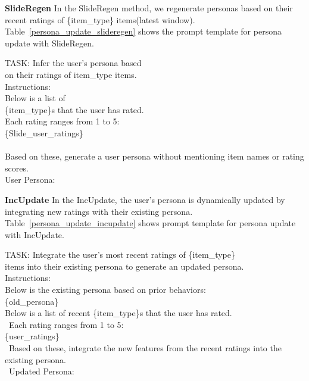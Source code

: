 \textbf{SlideRegen} 
In the SlideRegen method, we regenerate personas based on their recent ratings of 
\{item\_type\} items(latest window). 
Table~\ref{persona_update_slideregen} shows the prompt template for persona update with SlideRegen.

\begin{tcolorbox}
    {\selectfont\small
    TASK: Infer the user's persona based \\
    on their ratings of {item\_type} items.\\
    Instructions: \\
    Below is a list of \\
    \{item\_type\}s that the user has rated. \\
    Each rating ranges from 1 to 5:\\
    \{Slide\_user\_ratings\}\\\\
Based on these, generate a user persona without mentioning item names or rating scores. 
\\
    User Persona:
   }
\end{tcolorbox}
\noindent\begin{minipage}{0.48\textwidth}
\label{persona_update_slideregen}
\end{minipage}
    
    
\textbf{IncUpdate}
In the IncUpdate, the user's persona is dynamically updated by integrating new ratings with their existing persona. Table~\ref{persona_update_incupdate} shows prompt template for persona update with IncUpdate.

\begin{tcolorbox} {\selectfont\small 
    TASK: 
    Integrate the user's most recent ratings of \{item\_type\} \\
    items into their existing persona to generate an updated persona. \\
    Instructions: \\
    Below is the existing persona based on prior behaviors: \\
    \{old\_persona\} \\
    Below is a list of recent \{item\_type\}s that the user has rated.\\
    \ Each rating ranges from 1 to 5:\\
    \{user\_ratings\}\\
    \ Based on these, integrate 
    the new features from the recent ratings into the existing persona.\\
    \ Updated Persona:
   }
    \end{tcolorbox}
    \noindent\begin{minipage}{0.48\textwidth}
    \label{persona_update_incupdate}
    \end{minipage}


